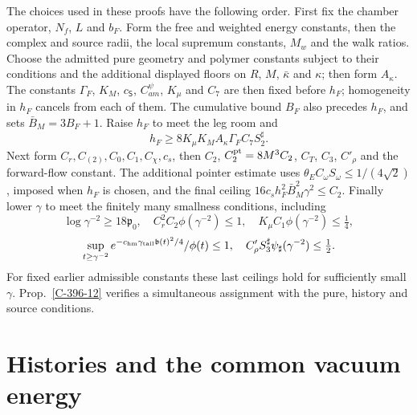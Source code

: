 \documentclass[11pt,letterpaper,reqno]{amsart}
\theoremstyle{definition}
\theoremstyle{remark}
\begin{document}
The choices used in these proofs have the following
order.  First fix the chamber operator, $N_f$, $L$
and $b_F$.  Form the free and weighted energy constants,
then the complex and source radii, the local supremum
constants, $M_w$ and the walk ratios.
Choose the admitted pure geometry and polymer constants
subject to their conditions and the additional displayed
floors on $R$, $M$, $\bar\kappa$ and $\kappa$;
then form $A_\kappa$.
The constants $\Gamma_F$, $K_M$, $c_{\mathsf S}$,
$C^\psi_{am}$, $K_\mu$ and $C_7$ are then fixed before
$h_F$; homogeneity in $h_F$ cancels from each of them.
The cumulative bound $B_F$ also precedes $h_F$, and
sets $\bar B_M=3B_F+1$.
Raise $h_F$ to meet the leg room and
\[
 h_F\ge8K_\mu K_MA_\kappa\Gamma_F C_7S_2^\sharp.
\]
Next form $C_r,C_{(2)},C_0,C_1,C_\chi,c_s$, then $C_2$,
$C_2^{\rm pt}=8M^3C_2$, $C_T$, $C_3$, $C'_\rho$ and the
forward-flow constant. The additional pointer estimate uses
$\theta_EC_\omega S_\omega\le1/(4\sqrt2)$, imposed when
$h_F$ is chosen, and the final ceiling
$16c_sh_F^2\bar B_M^2\gamma^2\le C_2$.
Finally lower $\gamma$ to meet the finitely many
smallness conditions, including
\[
 \log\gamma^{-2}\ge18\mathfrak p_0,
 \quad C_r^2C_2\phi(\gamma^{-2})\le1,
 \quad K_\mu C_1\phi(\gamma^{-2})\le\tfrac14,
\]
\[
 \sup_{t\ge\gamma^{-2}}
   e^{-c_{\rm hm}\gamma_{\rm tail}\mathfrak b(t)^2/4}/\phi(t)
 \le1,
 \quad C'_\rho S_3^\sharp\psi_\sharp(\gamma^{-2})\le\tfrac12.
\]
For fixed earlier admissible constants these last
ceilings hold for sufficiently small $\gamma$.
Prop.~\ref{C-396-12} verifies a simultaneous assignment
with the pure, history and source conditions.


\section{Histories and the common vacuum energy}\label{sec:qcd-histories}
\end{document}
